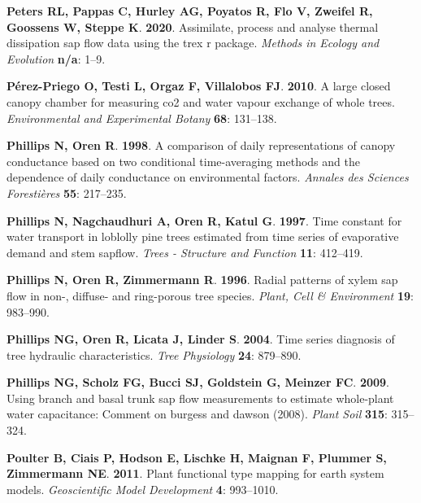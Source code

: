 \documentclass[11pt,twoside]{reedthesis}
\begin{document}
\hypertarget{ref-Richard2020}{}
\textbf{\textnormal{Peters RL}, \textnormal{Pappas C},
\textnormal{Hurley AG}, \textnormal{Poyatos R}, \textnormal{Flo V},
\textnormal{Zweifel R}, \textnormal{Goossens W}, \textnormal{Steppe K}}.
\textbf{2020}. Assimilate, process and analyse thermal dissipation sap
flow data using the trex r package. \emph{Methods in Ecology and
Evolution} \textbf{n/a}: 1--9.

\hypertarget{ref-Perezpriego2010}{}
\textbf{\textnormal{Pérez-Priego O}, \textnormal{Testi L},
\textnormal{Orgaz F}, \textnormal{Villalobos FJ}}. \textbf{2010}. A
large closed canopy chamber for measuring co2 and water vapour exchange
of whole trees. \emph{Environmental and Experimental Botany}
\textbf{68}: 131--138.

\hypertarget{ref-phillips_comparison_1998}{}
\textbf{\textnormal{Phillips N}, \textnormal{Oren R}}. \textbf{1998}. A
comparison of daily representations of canopy conductance based on two
conditional time-averaging methods and the dependence of daily
conductance on environmental factors. \emph{Annales des Sciences
Forestières} \textbf{55}: 217--235.

\hypertarget{ref-Phillips1997}{}
\textbf{\textnormal{Phillips N}, \textnormal{Nagchaudhuri A},
\textnormal{Oren R}, \textnormal{Katul G}}. \textbf{1997}. Time constant
for water transport in loblolly pine trees estimated from time series of
evaporative demand and stem sapflow. \emph{Trees - Structure and
Function} \textbf{11}: 412--419.

\hypertarget{ref-Phillips1996}{}
\textbf{\textnormal{Phillips N}, \textnormal{Oren R},
\textnormal{Zimmermann R}}. \textbf{1996}. Radial patterns of xylem sap
flow in non-, diffuse- and ring-porous tree species. \emph{Plant, Cell
\& Environment} \textbf{19}: 983--990.

\hypertarget{ref-Phillips2004}{}
\textbf{\textnormal{Phillips NG}, \textnormal{Oren R},
\textnormal{Licata J}, \textnormal{Linder S}}. \textbf{2004}. Time
series diagnosis of tree hydraulic characteristics. \emph{Tree
Physiology} \textbf{24}: 879--890.

\hypertarget{ref-phillips2009}{}
\textbf{\textnormal{Phillips NG}, \textnormal{Scholz FG},
\textnormal{Bucci SJ}, \textnormal{Goldstein G}, \textnormal{Meinzer
FC}}. \textbf{2009}. Using branch and basal trunk sap flow measurements
to estimate whole-plant water capacitance: Comment on burgess and dawson
(2008). \emph{Plant Soil} \textbf{315}: 315--324.

\hypertarget{ref-Poulter2011}{}
\textbf{\textnormal{Poulter B}, \textnormal{Ciais P}, \textnormal{Hodson
E}, \textnormal{Lischke H}, \textnormal{Maignan F}, \textnormal{Plummer
S}, \textnormal{Zimmermann NE}}. \textbf{2011}. Plant functional type
mapping for earth system models. \emph{Geoscientific Model Development}
\textbf{4}: 993--1010.
\end{document}
